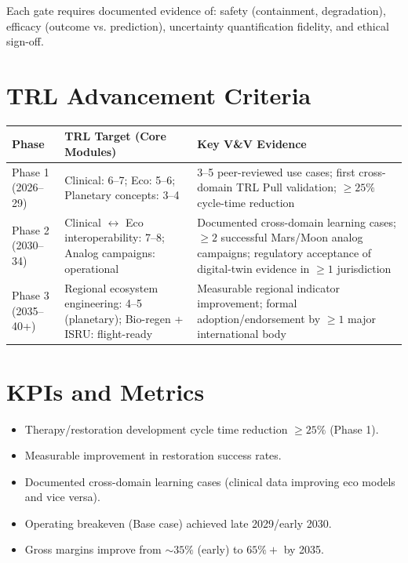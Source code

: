\documentclass[11pt,a4paper]{report}
\begin{document}
Each gate requires documented evidence of: safety (containment, degradation), efficacy (outcome vs. prediction), uncertainty quantification fidelity, and ethical sign-off.

\section{TRL Advancement Criteria}

\begin{tabular}{lll}
\toprule
\textbf{Phase} & \textbf{TRL Target (Core Modules)} & \textbf{Key V\&V Evidence} \\
\midrule
Phase 1 (2026--29) & Clinical: 6--7; Eco: 5--6; Planetary concepts: 3--4 & 3--5 peer-reviewed use cases; first cross-domain TRL Pull validation; $\geq 25\%$ cycle-time reduction \\
Phase 2 (2030--34) & Clinical $\leftrightarrow$ Eco interoperability: 7--8; Analog campaigns: operational & Documented cross-domain learning cases; $\geq 2$ successful Mars/Moon analog campaigns; regulatory acceptance of digital-twin evidence in $\geq 1$ jurisdiction \\
Phase 3 (2035--40+) & Regional ecosystem engineering: 4--5 (planetary); Bio-regen + ISRU: flight-ready & Measurable regional indicator improvement; formal adoption/endorsement by $\geq 1$ major international body \\
\bottomrule
\end{tabular}

\section{KPIs and Metrics}

\begin{itemize}
    \item Therapy/restoration development cycle time reduction $\geq 25\%$ (Phase 1).
    \item Measurable improvement in restoration success rates.
    \item Documented cross-domain learning cases (clinical data improving eco models and vice versa).
    \item Operating breakeven (Base case) achieved late 2029/early 2030.
    \item Gross margins improve from $\sim 35\%$ (early) to $65\%+$ by 2035.
\end{itemize}

\end{document}
